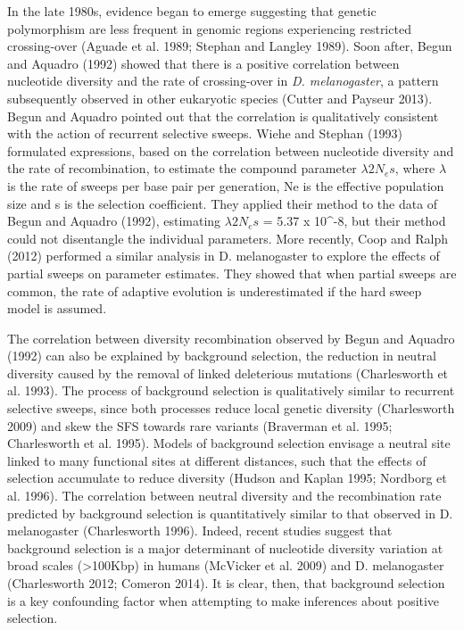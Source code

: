 In the late 1980s, evidence began to emerge suggesting that genetic polymorphism are less frequent in genomic regions experiencing restricted crossing-over (Aguade et al. 1989; Stephan and Langley 1989). Soon after, Begun and Aquadro (1992) showed that there is a positive correlation between nucleotide diversity and the rate of crossing-over in \emph{D. melanogaster}, a pattern subsequently observed in other eukaryotic species (Cutter and Payseur 2013). Begun and Aquadro pointed out that the correlation is qualitatively consistent with the action of recurrent selective sweeps. Wiehe and Stephan (1993) formulated expressions, based on the correlation between nucleotide diversity and the rate of recombination, to estimate the compound parameter $\lambda2N_{e}s$, where $\lambda$ is the rate of sweeps per base pair per generation, Ne is the effective population size and s is the selection coefficient. They applied their method to the data of Begun and Aquadro (1992), estimating $\lambda2N_{e}s$ = 5.37 x 10^{-8}, but their method could not disentangle the individual parameters. More recently, Coop and Ralph (2012) performed a similar analysis in D. melanogaster to explore the effects of partial sweeps on parameter estimates. They showed that when partial sweeps are common, the rate of adaptive evolution is underestimated if the hard sweep model is assumed.
 
The correlation between diversity recombination observed by Begun and Aquadro (1992) can also be explained by background selection, the reduction in neutral diversity caused by the removal of linked deleterious mutations (Charlesworth et al. 1993). The process of background selection is qualitatively similar to recurrent selective sweeps, since both processes reduce local genetic diversity (Charlesworth 2009) and skew the SFS towards rare variants (Braverman et al. 1995; Charlesworth et al. 1995). Models of background selection envisage a neutral site linked to many functional sites at different distances, such that the effects of selection accumulate to reduce diversity (Hudson and Kaplan 1995; Nordborg et al. 1996). The correlation between neutral diversity and the recombination rate predicted by background selection is quantitatively similar to that observed in D. melanogaster (Charlesworth 1996). Indeed, recent studies suggest that background selection is a major determinant of nucleotide diversity variation at broad scales (>100Kbp) in humans (McVicker et al. 2009) and D. melanogaster (Charlesworth 2012; Comeron 2014). It is clear, then, that background selection is a key confounding factor when attempting to make inferences about positive selection.
 
